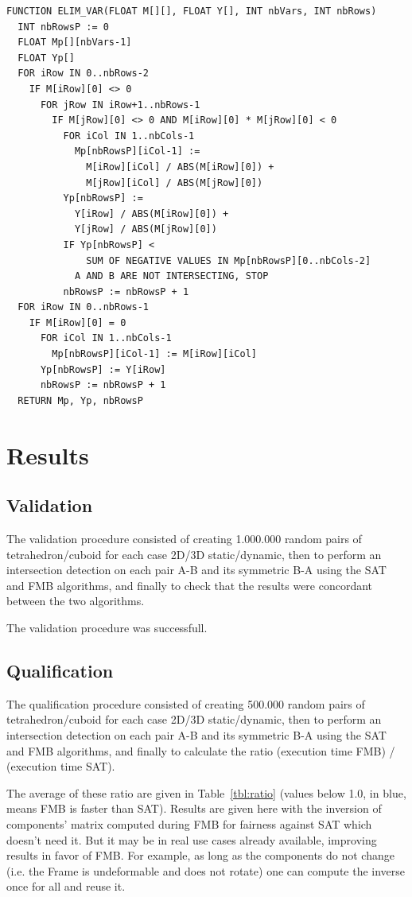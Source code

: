 \documentclass[12pt, a4paper]{article}
\begin{document}
\begin{itemize}
\begin{lstlisting}[breaklines, caption={The FMB algorithm.}, label={lst:fmb}]
FUNCTION ELIM_VAR(FLOAT M[][], FLOAT Y[], INT nbVars, INT nbRows)
  INT nbRowsP := 0 
  FLOAT Mp[][nbVars-1]
  FLOAT Yp[]
  FOR iRow IN 0..nbRows-2
    IF M[iRow][0] <> 0
      FOR jRow IN iRow+1..nbRows-1
        IF M[jRow][0] <> 0 AND M[iRow][0] * M[jRow][0] < 0
          FOR iCol IN 1..nbCols-1
            Mp[nbRowsP][iCol-1] := 
              M[iRow][iCol] / ABS(M[iRow][0]) + 
              M[jRow][iCol] / ABS(M[jRow][0]) 
          Yp[nbRowsP] := 
            Y[iRow] / ABS(M[iRow][0]) +
            Y[jRow] / ABS(M[jRow][0]) 
          IF Yp[nbRowsP] < 
              SUM OF NEGATIVE VALUES IN Mp[nbRowsP][0..nbCols-2]
            A AND B ARE NOT INTERSECTING, STOP
          nbRowsP := nbRowsP + 1 
  FOR iRow IN 0..nbRows-1
    IF M[iRow][0] = 0
      FOR iCol IN 1..nbCols-1
        Mp[nbRowsP][iCol-1] := M[iRow][iCol] 
      Yp[nbRowsP] := Y[iRow] 
      nbRowsP := nbRowsP + 1 
  RETURN Mp, Yp, nbRowsP
\end{lstlisting}

\section{Results}

\subsection{Validation}

The validation procedure consisted of creating 1.000.000 random pairs of tetrahedron/cuboid for each case 2D/3D static/dynamic, then to perform an intersection detection on each pair A-B and its symmetric B-A using the SAT and FMB algorithms, and finally to check that the results were concordant between the two algorithms.

The validation procedure was successfull.

\subsection{Qualification}

The qualification procedure consisted of creating 500.000 random pairs of tetrahedron/cuboid for each case 2D/3D static/dynamic, then to perform an intersection detection on each pair A-B and its symmetric B-A using the SAT and FMB algorithms, and finally to calculate the ratio (execution time FMB) / (execution time SAT).

The average of these ratio are given in Table~\ref{tbl:ratio} (values below 1.0, in blue, means FMB is faster than SAT). Results are given here with the inversion of components' matrix computed during FMB for fairness against SAT which doesn't need it. But it may be in real use cases already available, improving results in favor of FMB. For example, as long as the components do not change (i.e. the Frame is undeformable and does not rotate) one can compute the inverse once for all and reuse it.


\end{itemize}
\end{document}
